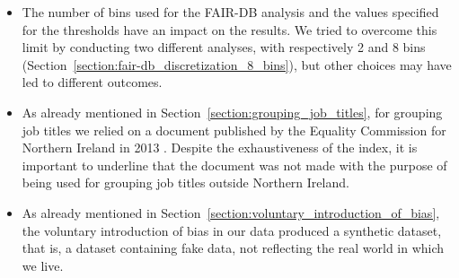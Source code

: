 \begin{itemize}
\item The number of bins used for the FAIR-DB analysis and the values specified for the thresholds have an impact on the results. We tried to overcome this limit by conducting two different analyses, with respectively 2 and 8 bins (Section~\ref{section:fair-db_discretization_8_bins}), but other choices may have led to different outcomes.
\item As already mentioned in Section~\ref{section:grouping_job_titles}, for grouping job titles we relied on a document published by the Equality Commission for Northern Ireland in 2013 \cite{equality2013index}. Despite the exhaustiveness of the index, it is important to underline that the document was not made with the purpose of being used for grouping job titles outside Northern Ireland.
\item As already mentioned in Section~\ref{section:voluntary_introduction_of_bias}, the voluntary introduction of bias in our data produced a synthetic dataset, that is, a dataset containing fake data, not reflecting the real world in which we live.
\end{itemize}
